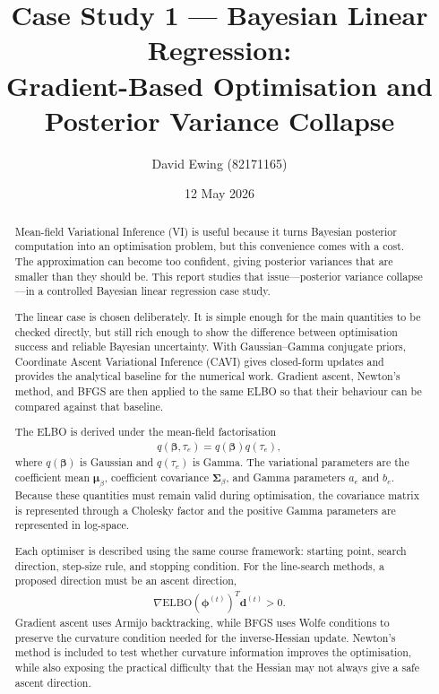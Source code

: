 \documentclass[11pt,a4paper]{article}
\title{
Case Study 1 --- Bayesian Linear Regression:\\[0.4em]
Gradient-Based Optimisation and Posterior Variance Collapse
}
\author{
  David Ewing (82171165)
}
\date{12 May 2026}
\newcommand{\ELBO}{\text{ELBO}}
\begin{document}
\maketitle

\begin{abstract}
\setlength{\parindent}{0pt}
\setlength{\parskip}{0.7em}

Mean-field Variational Inference (VI) is useful because it turns Bayesian posterior computation into an optimisation problem, but this convenience comes with a cost. The approximation can become too confident, giving posterior variances that are smaller than they should be. This report studies that issue---posterior variance collapse---in a controlled Bayesian linear regression case study.

The linear case is chosen deliberately. It is simple enough for the main quantities to be checked directly, but still rich enough to show the difference between optimisation success and reliable Bayesian uncertainty. With Gaussian--Gamma conjugate priors, Coordinate Ascent Variational Inference (CAVI) gives closed-form updates and provides the analytical baseline for the numerical work. Gradient ascent, Newton's method, and BFGS are then applied to the same ELBO so that their behaviour can be compared against that baseline.

The ELBO is derived under the mean-field factorisation
\begin{align*}
q(\bm{\beta},\tau_e)=q(\bm{\beta})q(\tau_e),
\end{align*}
where $q(\bm{\beta})$ is Gaussian and $q(\tau_e)$ is Gamma. The variational parameters are the coefficient mean $\bm{\mu}_\beta$, coefficient covariance $\bm{\Sigma}_\beta$, and Gamma parameters $a_e$ and $b_e$. Because these quantities must remain valid during optimisation, the covariance matrix is represented through a Cholesky factor and the positive Gamma parameters are represented in log-space.

Each optimiser is described using the same course framework: starting point, search direction, step-size rule, and stopping condition. For the line-search methods, a proposed direction must be an ascent direction,
\begin{align*}
\nabla\ELBO(\bm{\phi}^{(t)})^T\bm{d}^{(t)} > 0.
\end{align*}
Gradient ascent uses Armijo backtracking, while BFGS uses Wolfe conditions to preserve the curvature condition needed for the inverse-Hessian update. Newton's method is included to test whether curvature information improves the optimisation, while also exposing the practical difficulty that the Hessian may not always give a safe ascent direction.


\end{abstract}
\end{document}
